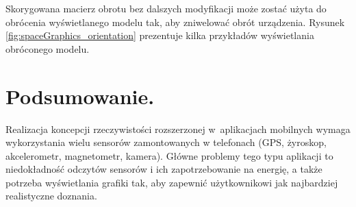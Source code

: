 \documentclass[a4paper,twocolumn,11pt]{article}
\begin{document}
 Skorygowana macierz obrotu bez dalszych modyfikacji może zostać użyta do obrócenia wyświetlanego modelu tak, aby zniwelować obrót urządzenia.
 Rysunek \ref{fig:spaceGraphics_orientation} prezentuje kilka przykładów wyświetlania obróconego modelu.
 
 




\section{Podsumowanie.} \label{sec:summary}

Realizacja koncepcji rzeczywistości rozszerzonej w~aplikacjach mobilnych wymaga wykorzystania wielu sensorów zamontowanych w telefonach (GPS, żyroskop, akcelerometr, magnetometr, kamera).
Główne problemy tego typu aplikacji to niedokładność odczytów sensorów i ich zapotrzebowanie na energię, a także potrzeba wyświetlania grafiki tak, aby zapewnić użytkownikowi jak najbardziej realistyczne doznania.

\end{document}
